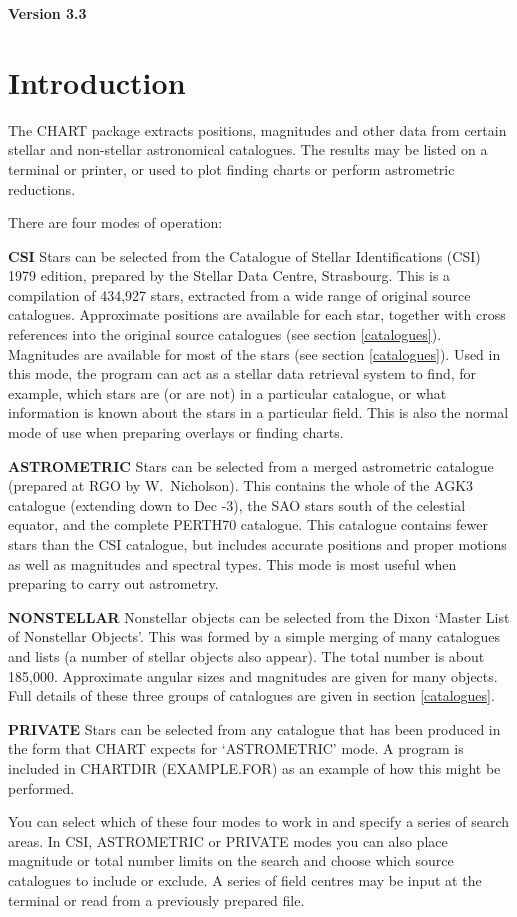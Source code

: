 \begin{center}
{\Large\bf Version 3.3}
\end{center}

\section{Introduction}

The CHART package extracts positions, magnitudes and other data from certain
stellar and non-stellar astronomical catalogues.
The results may be listed on a terminal or printer, or used to plot finding
charts or perform astrometric reductions.

There are four modes of operation:
\begin{list}{}{\setlength{\leftmargin}{20mm}
\setlength{\labelsep}{5mm}
\setlength{\labelwidth}{5mm}
}
\item[{\bf CSI}]
Stars can be selected from the Catalogue of Stellar Identifications (CSI) 1979
edition, prepared by the Stellar Data Centre, Strasbourg.
This is a compilation of 434,927 stars, extracted from a wide range of original
source catalogues.
Approximate positions are available for each star, together with cross
references into the original source catalogues (see section \ref{catalogues}).
Magnitudes are available for most of the stars (see section \ref{catalogues}).
Used in this mode, the program can act as a stellar data retrieval system to
find, for example, which stars are (or are not) in a particular catalogue, or
what information is known about the stars in a particular field.
This is also the normal mode of use when preparing overlays or finding charts.
\item[{\bf ASTROMETRIC}]
Stars can be selected from a merged astrometric catalogue (prepared at RGO by
W.~Nicholson).
This contains the whole of the AGK3 catalogue (extending down to Dec -3), the
SAO stars south of the celestial equator, and the complete PERTH70 catalogue.
This catalogue contains fewer stars than the CSI catalogue, but includes
accurate positions and proper motions as well as magnitudes and spectral types.
This mode is most useful when preparing to carry out astrometry.
\item[{\bf NONSTELLAR}]
Nonstellar objects can be selected from the Dixon `Master List of Nonstellar
Objects'.
This was formed by a simple merging of many catalogues and lists (a number of
stellar objects also appear).
The total number is about 185,000.
Approximate angular sizes and magnitudes are given for many objects.
Full details of these three groups of catalogues are given in section 
\ref{catalogues}.
\item[{\bf PRIVATE}]
Stars can be selected from any catalogue that has been produced in the form that
CHART expects for `ASTROMETRIC' mode.
A program is included in CHARTDIR (EXAMPLE.FOR) as an example of how this might
be performed.
\end{list}
You can select which of these four modes to work in and specify a series of
search areas.
In CSI, ASTROMETRIC or PRIVATE modes you can also place magnitude or total
number limits on the search and choose which source catalogues to include or
exclude.
A series of field centres may be input at the terminal or read from a previously
prepared file.

